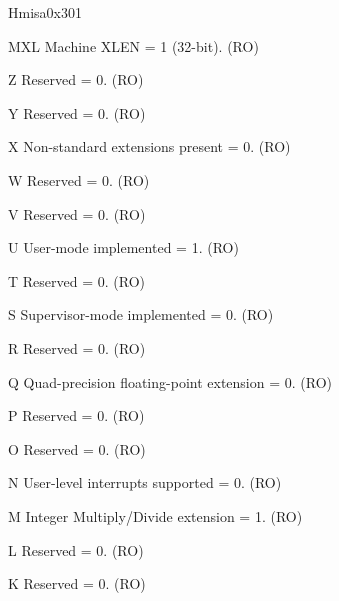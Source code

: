\begin{register}{H}{misa}{0x301}\label{regdesc:MISA}
%
%
%
%
%
%
%
%
%
%
%
%
%
%
%
%
%
%
%
%
%
%
%
%
%
%
%
%
\regnewline%
\begin{regdesc}\begin{reglist}
\label{fielddesc:MISAMXL}\item [MXL] Machine XLEN = 1 (32-bit). (RO)
\label{fielddesc:MISAZ}\item [Z] Reserved = 0. (RO)
\label{fielddesc:MISAY}\item [Y] Reserved = 0. (RO)
\label{fielddesc:MISAX}\item [X] Non-standard extensions present = 0. (RO)
\label{fielddesc:MISAW}\item [W] Reserved = 0. (RO)
\label{fielddesc:MISAV}\item [V] Reserved = 0. (RO)
\label{fielddesc:MISAU}\item [U] User-mode implemented = 1. (RO)
\label{fielddesc:MISAT}\item [T] Reserved = 0. (RO)
\label{fielddesc:MISAS}\item [S] Supervisor-mode implemented = 0. (RO)
\label{fielddesc:MISAR}\item [R] Reserved = 0. (RO)
\label{fielddesc:MISAQ}\item [Q] Quad-precision floating-point extension = 0. (RO)
\label{fielddesc:MISAP}\item [P] Reserved = 0. (RO)
\label{fielddesc:MISAO}\item [O] Reserved = 0. (RO)
\label{fielddesc:MISAN}\item [N] User-level interrupts supported = 0. (RO)
\label{fielddesc:MISAM}\item [M] Integer Multiply/Divide extension = 1. (RO)
\label{fielddesc:MISAL}\item [L] Reserved = 0. (RO)
\label{fielddesc:MISAK}\item [K] Reserved = 0. (RO)

\end{reglist}
\end{regdesc}
\end{register}
